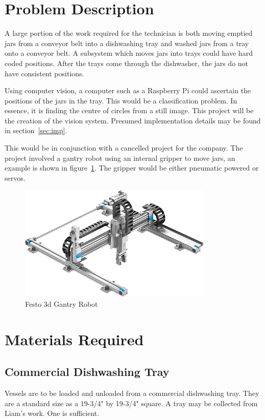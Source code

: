 \documentclass[11pt]{article}
\begin{document}
    \section{Problem Description}
        A large portion of the work required for the technician is both moving emptied jars from a conveyor belt into a dishwashing tray and washed jars from a tray onto a conveyor belt. A subsystem which moves jars into trays could have hard coded positions. After the trays come through the dishwasher, the jars do not have consistent positions. 

        Using computer vision, a computer such as a Raspberry Pi could ascertain the positions of the jars in the tray. This would be a classification problem. In essence, it is finding the centre of circles from a still image. This project will be the creation of the vision system. Presumed implementation details may be found in section~\ref{sec:imp}.

        This would be in conjunction with a cancelled project for the company. The project involved a gantry robot using an internal gripper to move jars, an example is shown in figure~\ref{fig:gantry}. The gripper would be either pneumatic powered or servos.

        \begin{figure}[ht]
            \centering
            \includegraphics[height=5.5cm]{gantry.jpg}
            \caption{Festo 3d Gantry Robot}\label{fig:gantry}
        \end{figure}

    \FloatBarrier
    \section{Materials Required}
        \subsection{Commercial Dishwashing Tray}
            Vessels are to be loaded and unloaded from a commercial dishwashing tray. They are a standard size as a 19-3/4" by 19-3/4" square. A tray may be collected from Liam's work. One is sufficient. 
\end{document}
